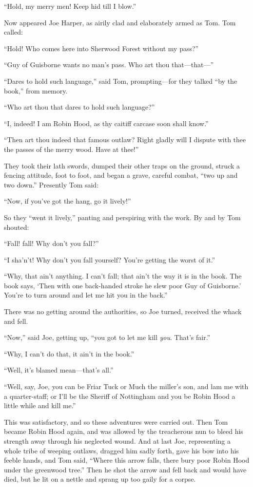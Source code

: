 \documentclass{book}
\begin{document}
“Hold, my merry men! Keep hid till I blow.”

Now appeared Joe Harper, as airily clad and elaborately armed as Tom. Tom called:

“Hold! Who comes here into Sherwood Forest without my pass?”

“Guy of Guisborne wants no man’s pass. Who art thou that—that—”

“Dares to hold such language,” said Tom, prompting—for they talked “by the book,” from memory.

“Who art thou that dares to hold such language?”

“I, indeed! I am Robin Hood, as thy caitiff carcase soon shall know.”

“Then art thou indeed that famous outlaw? Right gladly will I dispute with thee the passes of the merry wood. Have at thee!”

They took their lath swords, dumped their other traps on the ground, struck a fencing attitude, foot to foot, and began a grave, careful combat, “two up and two down.” Presently Tom said:

“Now, if you’ve got the hang, go it lively!”

So they “went it lively,” panting and perspiring with the work. By and by Tom shouted:

“Fall! fall! Why don’t you fall?”

“I sha’n’t! Why don’t you fall yourself? You’re getting the worst of it.”

“Why, that ain’t anything. I can’t fall; that ain’t the way it is in the book. The book says, ‘Then with one back-handed stroke he slew poor Guy of Guisborne.’ You’re to turn around and let me hit you in the back.”

There was no getting around the authorities, so Joe turned, received the whack and fell.

“Now,” said Joe, getting up, “you got to let me kill \emph{you}. That’s fair.”

“Why, I can’t do that, it ain’t in the book.”

“Well, it’s blamed mean—that’s all.”

“Well, say, Joe, you can be Friar Tuck or Much the miller’s son, and lam me with a quarter-staff; or I’ll be the Sheriff of Nottingham and you be Robin Hood a little while and kill me.”

This was satisfactory, and so these adventures were carried out. Then Tom became Robin Hood again, and was allowed by the treacherous nun to bleed his strength away through his neglected wound. And at last Joe, representing a whole tribe of weeping outlaws, dragged him sadly forth, gave his bow into his feeble hands, and Tom said, “Where this arrow falls, there bury poor Robin Hood under the greenwood tree.” Then he shot the arrow and fell back and would have died, but he lit on a nettle and sprang up too gaily for a corpse.
\end{document}
